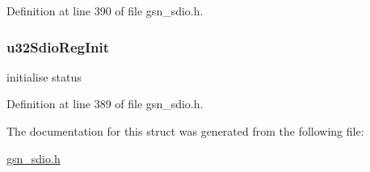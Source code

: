 Definition at line 390 of file gsn\_\-sdio.h.

\hypertarget{a00224_a97df769de934b3150a03bd45577f37b8}{
\subsubsection[{u32SdioRegInit}]{ {\bf u32SdioRegInit}}}
\label{a00224_a97df769de934b3150a03bd45577f37b8}
initialise status 

Definition at line 389 of file gsn\_\-sdio.h.



The documentation for this struct was generated from the following file:\begin{DoxyCompactItemize}
\item 
\hyperlink{a00584}{gsn\_\-sdio.h}\end{DoxyCompactItemize}
